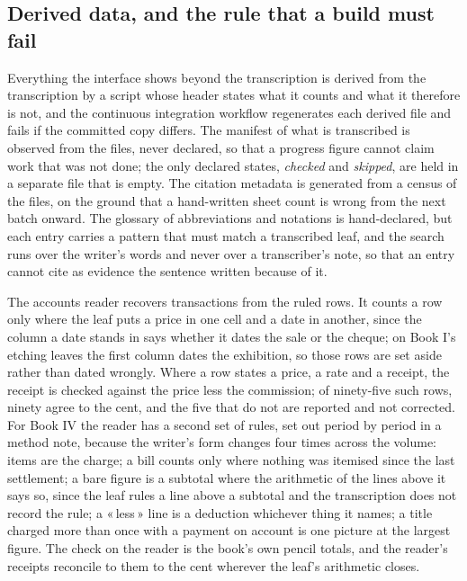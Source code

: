 \documentclass[11pt]{article}
\newcommand{\q}[1]{«\,#1\,»}
\begin{document}
\subsection{Derived data, and the rule that a build must fail}

Everything the interface shows beyond the transcription is derived from the transcription by a script whose header states what it counts and what it therefore is not, and the continuous integration workflow regenerates each derived file and fails if the committed copy differs. The manifest of what is transcribed is observed from the files, never declared, so that a progress figure cannot claim work that was not done; the only declared states, \emph{checked} and \emph{skipped}, are held in a separate file that is empty. The citation metadata is generated from a census of the files, on the ground that a hand-written sheet count is wrong from the next batch onward. The glossary of abbreviations and notations is hand-declared, but each entry carries a pattern that must match a transcribed leaf, and the search runs over the writer's words and never over a transcriber's note, so that an entry cannot cite as evidence the sentence written because of it.

The accounts reader recovers transactions from the ruled rows. It counts a row only where the leaf puts a price in one cell and a date in another, since the column a date stands in says whether it dates the sale or the cheque; on Book I's etching leaves the first column dates the exhibition, so those rows are set aside rather than dated wrongly. Where a row states a price, a rate and a receipt, the receipt is checked against the price less the commission; of ninety-five such rows, ninety agree to the cent, and the five that do not are reported and not corrected. For Book IV the reader has a second set of rules, set out period by period in a method note, because the writer's form changes four times across the volume: items are the charge; a bill counts only where nothing was itemised since the last settlement; a bare figure is a subtotal where the arithmetic of the lines above it says so, since the leaf rules a line above a subtotal and the transcription does not record the rule; a \q{less} line is a deduction whichever thing it names; a title charged more than once with a payment on account is one picture at the largest figure. The check on the reader is the book's own pencil totals, and the reader's receipts reconcile to them to the cent wherever the leaf's arithmetic closes.
\end{document}
